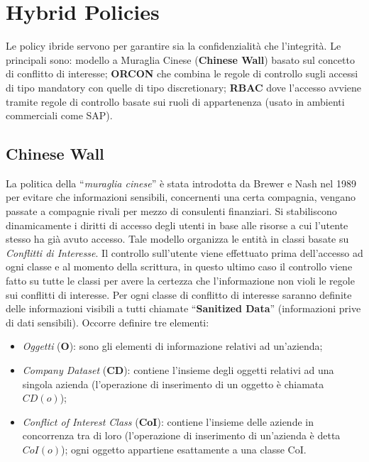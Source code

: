 \section{Hybrid Policies}

Le policy ibride servono per garantire sia la confidenzialità che l'integrità.
Le principali sono: modello a Muraglia Cinese (\textbf{Chinese Wall}) basato sul
concetto di conflitto di interesse; \textbf{ORCON} che combina le regole di
controllo sugli accessi di tipo mandatory con quelle di tipo discretionary;
\textbf{RBAC} dove l'accesso avviene tramite regole di controllo basate sui
ruoli di appartenenza (usato in ambienti commerciali come SAP).

\subsection{Chinese Wall}

La politica della “\textit{muraglia cinese}” è stata introdotta da Brewer e Nash
nel 1989 per evitare che informazioni sensibili, concernenti una certa compagnia,
vengano passate a compagnie rivali per mezzo di consulenti finanziari.
Si stabiliscono dinamicamente i diritti di accesso degli utenti in base
alle risorse a cui l'utente stesso ha già avuto accesso.
Tale modello organizza le entità in classi basate su \textit{Conflitti di Interesse}.
Il controllo sull'utente
viene effettuato prima dell'accesso ad ogni classe e al momento della scrittura,
in questo ultimo
caso il controllo viene fatto su tutte le classi per avere la certezza che
l'informazione non violi le
regole sui conflitti di interesse. Per ogni classe di conflitto di interesse
saranno definite delle
informazioni visibili a tutti chiamate “\textbf{Sanitized Data}”
(informazioni prive di dati sensibili).
Occorre definire tre elementi:

\begin{itemize}
    \item \textit{Oggetti} (\textbf{O}): sono gli elementi di informazione
          relativi ad un'azienda;
    \item \textit{Company Dataset} (\textbf{CD}): contiene l'insieme degli
          oggetti relativi ad una singola azienda
          (l'operazione di inserimento di un oggetto è chiamata \(CD(o)\));
    \item \textit{Conflict of Interest Class} (\textbf{CoI}): contiene
          l'insieme delle aziende in concorrenza tra di
          loro (l'operazione di inserimento di un'azienda è detta \(CoI(o)\));
          ogni oggetto appartiene
          esattamente a una classe CoI.
\end{itemize}

